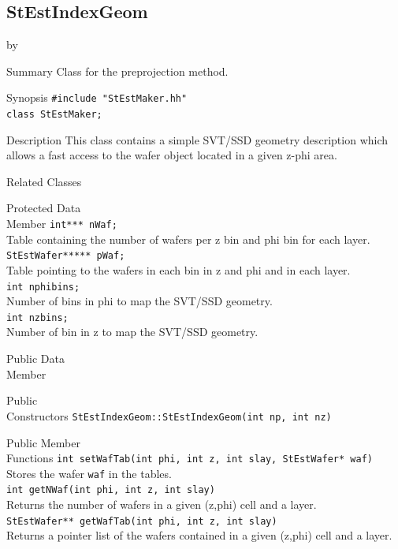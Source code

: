 \documentclass[twoside]{article}
\newcommand{\entrylabel}[1]{\mbox{\textbf{{#1}}}\hfil}%
\newenvironment{entry}
{\begin{list}{}%
    {\renewcommand{\makelabel}{\entrylabel}%
     \setlength{\labelwidth}{90pt}%
     \setlength{\leftmargin}{\labelwidth}
     \advance\leftmargin by \labelsep%
      }%
    }%
  {\end{list}}
\newcommand{\Entrylabel}[1]%
{\raisebox{0pt}[1ex][0pt]{\makebox[\labelwidth][l]%
    {\parbox[t]{\labelwidth}{\hspace{0pt}\textbf{{#1}}}}}}
\newenvironment{Entry}%
{\renewcommand{\entrylabel}{\Entrylabel}\begin{entry}}%
  {\end{entry}}
\begin{document}
\subsection{StEstIndexGeom}
\label{sec:StestIndexGeomq}
\begin{Entry}
\item[Summary]
Class for the preprojection method.\\
\item[Synopsis]
    \verb+#include "StEstMaker.hh"+\\
    \verb+class StEstMaker;+\\
\item[Description]
	This class contains a simple SVT/SSD geometry description which allows a fast access to the wafer object located in a given z-phi area.\\
\item[Related Classes]
	
\item[Protected Data\\ Member]
	\verb+int*** nWaf;+\\
	Table containing the number of wafers per z bin and phi bin for each layer.\\	
	\verb+StEstWafer***** pWaf;+\\	
	Table pointing to the wafers in each bin in z and phi and in each layer.\\
	\verb+int nphibins;+\\
	Number of bins in phi to map the SVT/SSD geometry.\\
	\verb+int nzbins;+\\
	Number of bin in z to map the SVT/SSD geometry.\\
\item[Public Data\\ Member]
\item[Public\\ Constructors]
	\verb+StEstIndexGeom::StEstIndexGeom(int np, int nz)+\\
\item[Public Member\\ Functions]
	\verb+int setWafTab(int phi, int z, int slay, StEstWafer* waf)+\\
	Stores the wafer \verb+waf+ in the tables.\\
	\verb+int getNWaf(int phi, int z, int slay)+\\
	Returns the number of wafers in a given (z,phi) cell and a layer.\\
	\verb+StEstWafer** getWafTab(int phi, int z, int slay)+\\
	Returns a pointer list of the wafers contained in a given (z,phi) cell and a layer.\\
\end{Entry}
\end{document}
